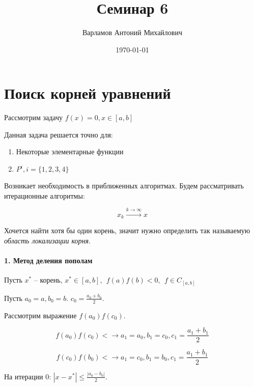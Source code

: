 \documentclass[10pt,a4paper]{article}
\title{Семинар 6}
\date{\today}
\author{Варламов Антоний Михайлович}
\begin{document}
	\maketitle
	\section{Поиск корней уравнений}
	
	Рассмотрим задачу $f\left(x\right) = 0, x \in \left[a, b\right]$
	
	Данная задача решается точно для:
	
	\begin{enumerate}
		\item Некоторые элементарные функции
		\item $P^{i}, i = \lbrace 1, 2, 3, 4\rbrace$
	\end{enumerate}
	
	Возникает необходимость в приближенных алгоритмах. Будем рассматривать 
	итерационные алгоритмы:
	
	\begin{equation}
		x_{k} \xrightarrow{k \to \infty} x
	\end{equation}
	
	Хочется найти хотя бы один корень, значит нужно определить так называемую 
	\textit{область локализации корня}.
	
	\paragraph{1. Метод деления пополам}
	
	Пусть $x^{*}$ -- корень, $x^{*} \in \left[a, b\right],  \ \ f\left(a\right)
	f\left(b\right) < 0, \ \ f \in C_{\left[a, b\right]}$
	
	Пусть $a_{0} = a, b_{0} = b$. $c_{0} = \frac{a_{0} + b_{0}}{2}$.
	
	Рассмотрим выражение $f\left(a_{0}\right)f\left(c_{0}\right)$.
	
	\begin{equation}
		f\left(a_{0}\right)f\left(c_{0}\right) < \rightarrow a_{1} = a_{0}, 
		b_{1} = c_{0}, c_{1} = \frac{a_{1} + b_{1}}{2}
	\end{equation}
	
	\begin{equation}
		f\left(c_{0}\right)f\left(b_{0}\right) < \rightarrow a_{1} = c_{0}, 
		b_{1} = b_{0}, c_{1} = \frac{a_{1} + b_{1}}{2}
	\end{equation}
	
	На итерации 0: $\left|x - x^{*}\right| \leqslant \frac{\left|a_{0} - 
	b_{0}\right|}{2}$.
	
\end{document}
